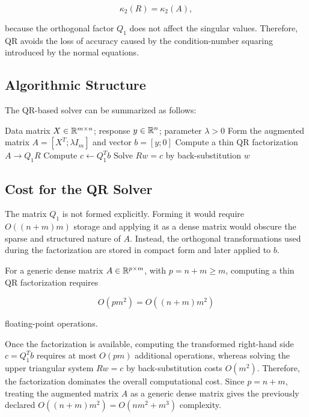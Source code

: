 \begin{equation}
    \kappa_2(R)=\kappa_2(A),
\end{equation}

\noindent because the orthogonal factor $Q_1$ does not affect the singular values.
Therefore, QR avoids the loss of accuracy caused by the condition-number
squaring introduced by the normal equations.

\subsection{Algorithmic Structure}

\noindent The QR-based solver can be summarized as follows:

\begin{algorithm}[H]
\caption{QR Solver for the Regularized Least Squares Problem}
\label{alg:qr_solver}
\begin{algorithmic}[1]
    \Require Data matrix $X\in\mathbb{R}^{m\times n}$; response $y\in\mathbb{R}^n$; parameter $\lambda>0$
    \State Form the augmented matrix $A = [X^T;\lambda I_m]$ and vector $b=[y;0]$
    \State Compute a thin QR factorization $A\rightarrow Q_1R$
    \State Compute $c \gets Q_1^T b$
    \State Solve $Rw=c$ by back-substitution
    \State \Return $w$
\end{algorithmic}
\end{algorithm}

\subsection{Cost for the QR Solver}
\label{sec:qr_cost_project}
\noindent The matrix $Q_1$ is not formed explicitly. Forming it would require $O((n+m)m)$ storage and applying it as a dense matrix would obscure the sparse and structured nature of $A$. Instead, the orthogonal transformations used during the factorization are stored in compact form and later applied to $b$.

\noindent For a generic dense matrix $A\in\mathbb{R}^{p\times m}$, with $p=n+m\geq m$, computing a thin QR factorization requires

\begin{equation}
    O(pm^2) = O((n+m)m^2)
\end{equation}

\noindent floating-point operations.

\noindent Once the factorization is available, computing the transformed right-hand side $c=Q_1^T b$ requires at most $O(pm)$ additional operations, whereas solving the upper triangular system $Rw=c$ by back-substitution costs $O(m^2)$.
Therefore, the factorization dominates the overall computational cost. Since $p=n+m$, treating the augmented matrix $A$ as a generic dense matrix gives the previously declared $O((n+m)m^2) = O(nm^2+m^3)$ complexity.

